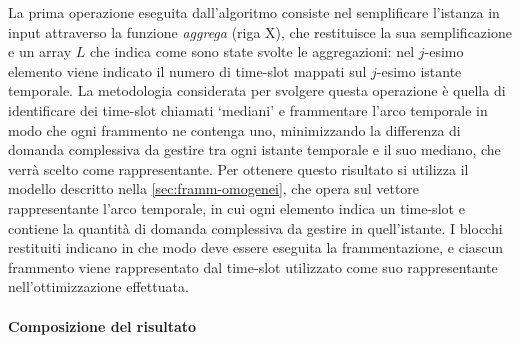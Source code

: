 La prima operazione eseguita dall'algoritmo consiste nel semplificare l'istanza in input attraverso la funzione \textit{aggrega} (riga X), che restituisce la sua semplificazione e un array $L$ che indica come sono state svolte le aggregazioni: nel $j$-esimo elemento viene indicato il numero di time-slot mappati sul $j$-esimo istante temporale. La metodologia considerata per svolgere questa operazione è quella di identificare dei time-slot chiamati `mediani' e frammentare l'arco temporale in modo che ogni frammento ne contenga uno, minimizzando la differenza di domanda complessiva da gestire tra ogni istante temporale e il suo mediano, che verrà scelto come rappresentante. Per ottenere questo risultato si utilizza il modello descritto nella \autoref{sec:framm-omogenei}, che opera sul vettore rappresentante l'arco temporale, in cui ogni elemento indica un time-slot e contiene la quantità di domanda complessiva da gestire in quell'istante. I blocchi restituiti indicano in che modo deve essere eseguita la frammentazione, e ciascun frammento viene rappresentato dal time-slot utilizzato come suo rappresentante nell'ottimizzazione effettuata.

\paragraph{Composizione del risultato}

